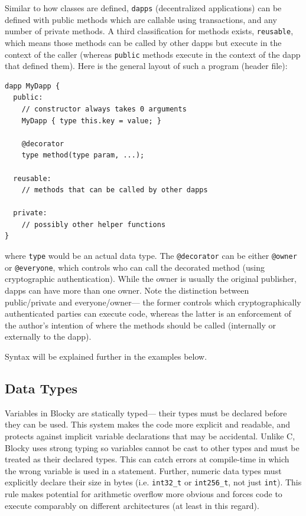 \documentclass[letterpaper]{article}
\begin{document}
Similar to how classes are defined, \texttt{dapps} (decentralized applications) can be defined with public methods which are callable using transactions, and any number of private methods. A third classification for methods exists, \texttt{reusable}, which means those methods can be called by other dapps but execute in the context of the caller (whereas \texttt{public} methods execute in the context of the dapp that defined them). Here is the general layout of such a program (header file):
\begin{lstlisting}
dapp MyDapp {
  public:
    // constructor always takes 0 arguments
    MyDapp { type this.key = value; }
    
    @decorator
    type method(type param, ...);
    
  reusable:
    // methods that can be called by other dapps
    
  private:
    // possibly other helper functions
}
\end{lstlisting}
where \texttt{type} would be an actual data type. The \texttt{@decorator} can be either \texttt{@owner} or \texttt{@everyone}, which controls who can call the decorated method (using cryptographic authentication). While the owner is usually the original publisher, dapps can have more than one owner. Note the distinction between public/private and everyone/owner--- the former controls which cryptographically authenticated parties can execute code, whereas the latter is an enforcement of the author's intention of where the methods should be called (internally or externally to the dapp).

Syntax will be explained further in the examples below.

\subsection{Data Types}
Variables in Blocky are statically typed--- their types must be declared before they can be used. This system makes the code more explicit and readable, and protects against implicit variable declarations that may be accidental. Unlike C, Blocky uses strong typing so variables cannot be cast to other types and must be treated as their declared types. This can catch errors at compile-time in which the wrong variable is used in a statement. Further, numeric data types must explicitly declare their size in bytes (i.e. \texttt{int32\_t} or \texttt{int256\_t}, not just \texttt{int}). This rule makes potential for arithmetic overflow more obvious and forces code to execute comparably on different architectures (at least in this regard).
\end{document}
